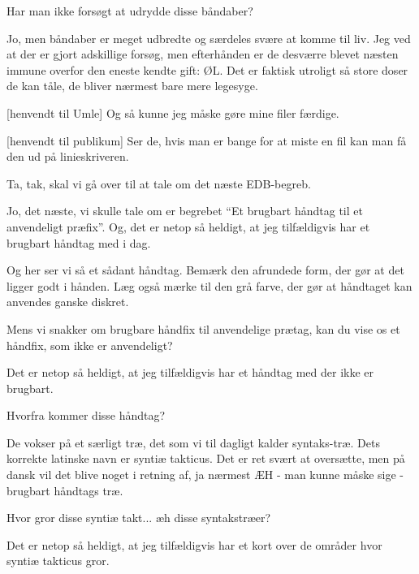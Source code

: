 \documentclass[a4paper,11pt]{article}
\begin{document}
\begin{sketch}
   Har man ikke forsøgt at udrydde disse båndaber?

   Jo, men båndaber er meget udbredte og særdeles svære at
  komme til liv.  Jeg ved at der er gjort adskillige forsøg, men
  efterhånden er de desværre blevet næsten immune overfor den eneste
  kendte gift: ØL.  Det er faktisk utroligt så store doser de kan
  tåle, de bliver nærmest bare mere legesyge.

  [henvendt til Umle] Og så kunne jeg måske gøre mine filer
  færdige.

  [henvendt til publikum] Ser de, hvis man er bange for at miste en fil kan man få den ud på linieskriveren.


   Ta, tak, skal vi gå over til at tale om det næste EDB-begreb.

   Jo, det næste, vi skulle tale om er begrebet "`Et brugbart
  håndtag til et anvendeligt præfix"'.  Og, det er netop så heldigt,
  at jeg tilfældigvis har et brugbart håndtag med i dag.


   Og her ser vi så et sådant håndtag.  Bemærk den afrundede
  form, der gør at det ligger godt i hånden.  Læg også mærke til den
  grå farve, der gør at håndtaget kan anvendes ganske diskret.

   Mens vi snakker om brugbare håndfix til anvendelige prætag,
  kan du vise os et håndfix, som ikke er anvendeligt?

   Det er netop så heldigt, at jeg tilfældigvis har et håndtag
  med der ikke er brugbart.


   Hvorfra kommer disse håndtag?

   De vokser på et særligt træ, det som vi til dagligt kalder
  syntaks-træ.  Dets korrekte latinske navn er syntiæ takticus.  Det
  er ret svært at oversætte, men på dansk vil det blive noget i
  retning af, ja nærmest ÆH - man kunne måske sige - brugbart håndtags
  træ.

   Hvor gror disse syntiæ takt... æh disse syntakstræer?

   Det er netop så heldigt, at jeg tilfældigvis har et kort
  over de områder hvor syntiæ takticus gror.


\end{sketch}
\end{document}

